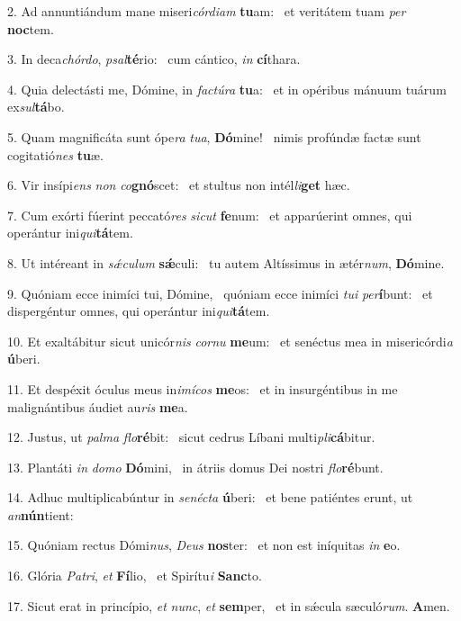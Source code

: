 2. Ad annuntiándum mane miseri\textit{cór}\textit{di}\textit{am} \textbf{tu}am: \ast\  et veritátem tuam \textit{per} \textbf{noc}tem.\

3. In deca\textit{chór}\textit{do}, \textit{psal}\textbf{té}rio: \ast\  cum cántico, \textit{in} \textbf{cí}thara.\

4. Quia delectásti me, Dómine, in \textit{fac}\textit{tú}\textit{ra} \textbf{tu}a: \ast\  et in opéribus mánuum tuárum ex\textit{sul}\textbf{tá}bo.\

5. Quam magnificáta sunt ópe\textit{ra} \textit{tu}\textit{a}, \textbf{Dó}mine! \ast\  nimis profúndæ factæ sunt cogitatió\textit{nes} \textbf{tu}æ.\

6. Vir insípi\textit{ens} \textit{non} \textit{co}\textbf{gnó}scet: \ast\  et stultus non intél\textit{li}\textbf{get} hæc.\

7. Cum exórti fúerint peccató\textit{res} \textit{sic}\textit{ut} \textbf{fe}num: \ast\  et apparúerint omnes, qui operántur ini\textit{qui}\textbf{tá}tem.\

8. Ut intéreant in \textit{sǽ}\textit{cu}\textit{lum} \textbf{sǽ}culi: \ast\  tu autem Altíssimus in ætér\textit{num}, \textbf{Dó}mine.\

9. Quóniam ecce inimíci tui, Dómine, \dag\  quóniam ecce inimíci \textit{tu}\textit{i} \textit{per}\textbf{í}bunt: \ast\  et dispergéntur omnes, qui operántur ini\textit{qui}\textbf{tá}tem.\

10. Et exaltábitur sicut unicór\textit{nis} \textit{cor}\textit{nu} \textbf{me}um: \ast\  et senéctus mea in misericórdi\textit{a} \textbf{ú}beri.\

11. Et despéxit óculus meus in\textit{i}\textit{mí}\textit{cos} \textbf{me}os: \ast\  et in insurgéntibus in me malignántibus áudiet au\textit{ris} \textbf{me}a.\

12. Justus, ut \textit{pal}\textit{ma} \textit{flo}\textbf{ré}bit: \ast\  sicut cedrus Líbani multi\textit{pli}\textbf{cá}bitur.\

13. Plantáti \textit{in} \textit{do}\textit{mo} \textbf{Dó}mini, \ast\  in átriis domus Dei nostri \textit{flo}\textbf{ré}bunt.\

14. Adhuc multiplicabúntur in \textit{se}\textit{néc}\textit{ta} \textbf{ú}beri: \ast\  et bene patiéntes erunt, ut \textit{an}\textbf{nún}tient:\

15. Quóniam rectus Dómi\textit{nus}, \textit{De}\textit{us} \textbf{nos}ter: \ast\  et non est iníquitas \textit{in} \textbf{e}o.\

16. Glória \textit{Pa}\textit{tri}, \textit{et} \textbf{Fí}lio, \ast\  et Spirítu\textit{i} \textbf{Sanc}to.\

17. Sicut erat in princípio, \textit{et} \textit{nunc}, \textit{et} \textbf{sem}per, \ast\  et in sǽcula sæculó\textit{rum}. \textbf{A}men.\

